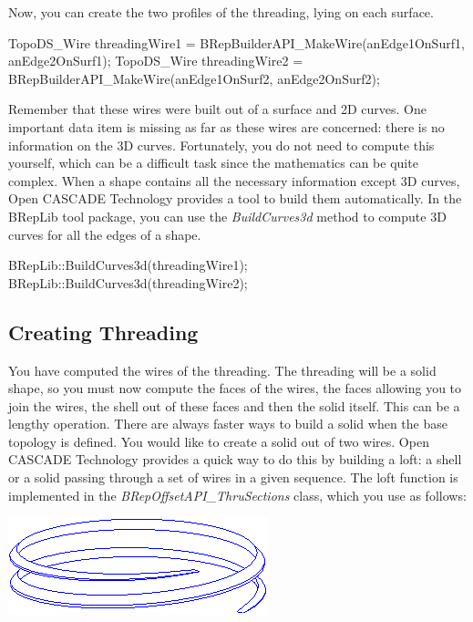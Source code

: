 Now, you can create the two profiles of the threading, lying on each surface.


\begin{DoxyCode}
TopoDS\_Wire threadingWire1 = BRepBuilderAPI\_MakeWire(anEdge1OnSurf1, anEdge2OnSurf1);
TopoDS\_Wire threadingWire2 = BRepBuilderAPI\_MakeWire(anEdge1OnSurf2, anEdge2OnSurf2);
\end{DoxyCode}


Remember that these wires were built out of a surface and 2D curves. One important data item is missing as far as these wires are concerned\+: there is no information on the 3D curves. Fortunately, you do not need to compute this yourself, which can be a difficult task since the mathematics can be quite complex. When a shape contains all the necessary information except 3D curves, Open C\+A\+S\+C\+A\+DE Technology provides a tool to build them automatically. In the B\+Rep\+Lib tool package, you can use the {\itshape Build\+Curves3d} method to compute 3D curves for all the edges of a shape.


\begin{DoxyCode}
BRepLib::BuildCurves3d(threadingWire1);
BRepLib::BuildCurves3d(threadingWire2);
\end{DoxyCode}
\hypertarget{occt__tutorial_OCCT_TUTORIAL_SUB4_4}{}\subsection{Creating Threading}\label{occt__tutorial_OCCT_TUTORIAL_SUB4_4}
You have computed the wires of the threading. The threading will be a solid shape, so you must now compute the faces of the wires, the faces allowing you to join the wires, the shell out of these faces and then the solid itself. This can be a lengthy operation. There are always faster ways to build a solid when the base topology is defined. You would like to create a solid out of two wires. Open C\+A\+S\+C\+A\+DE Technology provides a quick way to do this by building a loft\+: a shell or a solid passing through a set of wires in a given sequence. The loft function is implemented in the {\itshape B\+Rep\+Offset\+A\+P\+I\+\_\+\+Thru\+Sections} class, which you use as follows\+:


\begin{DoxyImageNoCaption}
\begin{center}
   \mbox{\includegraphics[width=285]{tutorial_image018.png}}
\end{center}
\end{DoxyImageNoCaption}



